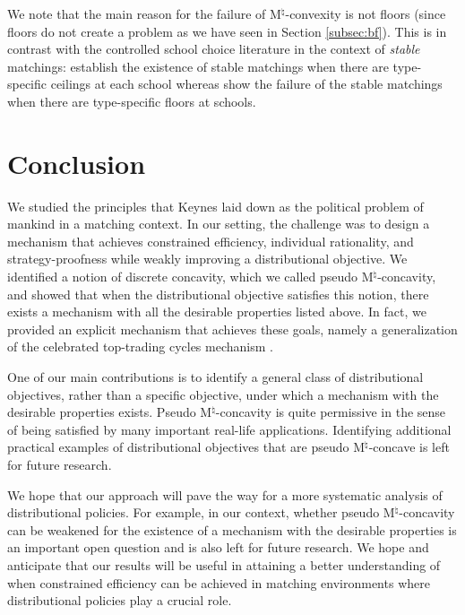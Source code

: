 \documentclass[12pt]{amsart}
\theoremstyle{remark}
\begin{document}
We note that the main reason for the failure of M$^{\natural}$-convexity is not floors (since floors
do not create a problem as we have seen in Section \ref{subsec:bf}). This is in contrast with the controlled school choice
literature in the context of %
\emph{stable} matchings: \cite{abdulson03} establish
the existence of stable matchings when there are type-specific ceilings at each school whereas \citet{ehayeyi14}
show the failure of the stable matchings when there are type-specific floors at schools.

\section{Conclusion}\label{sec:conclusion}
We studied the principles that Keynes laid down as the political problem of mankind in a matching context. In our setting,
the challenge was to design a mechanism that achieves constrained efficiency, individual rationality, and strategy-proofness
while weakly improving a distributional objective. We identified a notion of discrete concavity, which we called
pseudo M$^{\natural}$-concavity, and showed that when the distributional objective satisfies this notion, there exists a mechanism
with all the desirable properties listed above.  In fact, we provided an explicit mechanism that achieves these goals, namely a
generalization of the celebrated top-trading cycles mechanism \citep{shasca74}. %

One of our main contributions is to identify a general class of distributional objectives, rather than a specific objective,
under which a mechanism with the desirable properties exists. Pseudo M$^{\natural}$-concavity is quite permissive in the sense
of being satisfied by many important real-life applications. Identifying additional practical examples of distributional
objectives that are pseudo M$^{\natural}$-concave is left for future research.

We hope that our approach will pave the way for a more systematic analysis of distributional policies. For example, in our
context, whether pseudo M$^{\natural}$-concavity can be weakened for the existence of a mechanism with the desirable properties
is an important open question and is also left for future research. We hope and anticipate that our results
will be useful in attaining a better understanding of when constrained efficiency can be achieved in matching environments where distributional policies play a crucial role.
\end{document}
